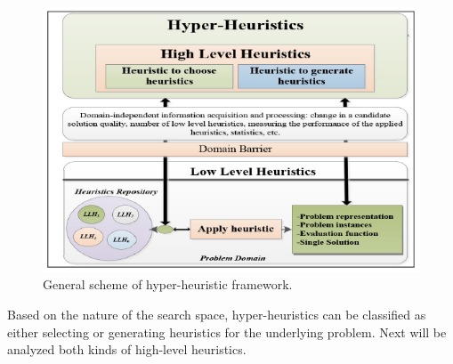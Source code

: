 \documentclass[conference]{IEEEtran}
\begin{document}
 
\begin{figure}[htb!] \label{fig:HyperHeuristics}
	\centering
	\includegraphics[scale=0.6]{figures/hyperheuristic.png}
	\caption{General scheme of hyper-heuristic framework.}
\end{figure}	





Based on the nature of the search space,  hyper-heuristics can be classified  \cite{burke2010classification} as either selecting or generating heuristics for the underlying problem. Next will be analyzed both kinds of high-level heuristics.
\end{document}
